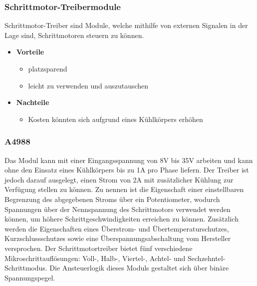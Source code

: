 \subsubsection{Schrittmotor-Treibermodule}
Schrittmotor-Treiber sind Module, welche mithilfe von externen Signalen in der Lage sind, Schrittmotoren steuern zu können.

\begin{itemize}
    \item \textbf{Vorteile}
    \begin{itemize}
        \item platzsparend
        \item leicht zu verwenden und auszutauschen
    \end{itemize}
    \item \textbf{Nachteile}
    \begin{itemize}
        \item Kosten könnten sich aufgrund eines Kühlkörpers erhöhen
    \end{itemize}
\end{itemize}

\subsubsection{A4988 }
Das Modul kann mit einer Eingangsspannung von 8V bis 35V arbeiten und kann ohne den Einsatz eines Kühlkörpers bis zu 1A pro Phase liefern.
Der Treiber ist jedoch darauf ausgelegt, einen Strom von 2A mit zusätzlicher Kühlung zur Verfügung stellen zu können.
Zu nennen ist die Eigenschaft einer einstellbaren Begrenzung des abgegebenen Stroms über ein Potentiometer,
wodurch Spannungen über der Nennspannung des Schrittmotors verwendet werden können, um höhere Schrittgeschwindigkeiten erreichen zu können.
Zusätzlich werden die Eigenschaften eines Überstrom- und Übertemperaturschutzes, Kurzschlussschutzes sowie eine Überspannungsabschaltung vom Hersteller versprochen.
Der Schrittmotortreiber bietet fünf verschiedene Mikroschrittauflösungen: Voll-, Halb-, Viertel-, Achtel- und Sechzehntel-Schrittmodus.
Die Ansteuerlogik dieses Moduls gestaltet sich über binäre Spannungspegel.

